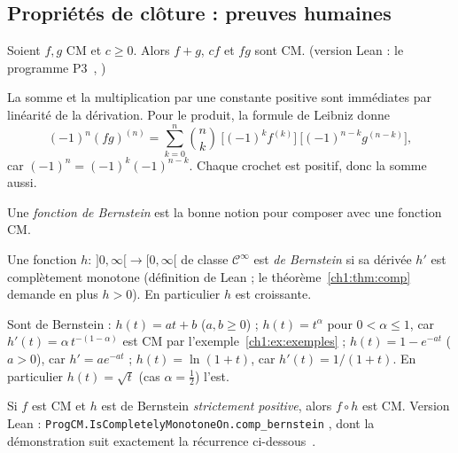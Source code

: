 \subsection{Propriétés de clôture : preuves humaines}

\begin{proposition}\label{ch1:prop:cloture}
Soient $f,g$ CM et $c\ge0$. Alors $f+g$, $cf$ et $fg$ sont CM. \tierC{} (version Lean : le programme P3~\cite{p3}, \tierA{})
\end{proposition}

\begin{humanproof}
La somme et la multiplication par une constante positive sont immédiates par linéarité de la dérivation.
Pour le produit, la formule de Leibniz donne
\[
  (-1)^n(fg)^{(n)}=\sum_{k=0}^{n}\binom nk\ \bigl[(-1)^kf^{(k)}\bigr]\ \bigl[(-1)^{n-k}g^{(n-k)}\bigr],
\]
car $(-1)^n=(-1)^k(-1)^{n-k}$. Chaque crochet est positif, donc la somme aussi.
\end{humanproof}

Une \emph{fonction de Bernstein} est la bonne notion pour composer avec une fonction CM.

\begin{definition}\label{ch1:def:bernstein}
Une fonction $h:\,]0,\infty[\to[0,\infty[$ de classe $\mathcal C^\infty$ est \emph{de Bernstein} si sa dérivée $h'$ est complètement monotone
(définition de Lean  ; le théorème~\ref{ch1:thm:comp} demande en plus $h>0$). En particulier $h$ est croissante.
\end{definition}

\begin{example}\label{ch1:ex:bernstein}
Sont de Bernstein : $h(t)=at+b$ ($a,b\ge0$) ; $h(t)=t^\alpha$ pour $0<\alpha\le1$, car
$h'(t)=\alpha\,t^{-(1-\alpha)}$ est CM par l'exemple~\ref{ch1:ex:exemples} ; $h(t)=1-e^{-at}$ ($a>0$), car $h'=ae^{-at}$ ; $h(t)=\ln(1+t)$,
car $h'(t)=1/(1+t)$. En particulier $h(t)=\sqrt t$ (cas $\alpha=\frac12$) l'est. \tierC{}
\end{example}

\begin{theorem}\label{ch1:thm:comp}
Si $f$ est CM et $h$ est de Bernstein \emph{strictement positive}, alors $f\circ h$ est CM. \tierC{} Version Lean :
\texttt{ProgCM.IsCompletelyMonotoneOn\allowbreak .comp\_bernstein} \tierA{}, dont la démonstration suit exactement la récurrence ci-dessous~\cite{p3}.
\end{theorem}

